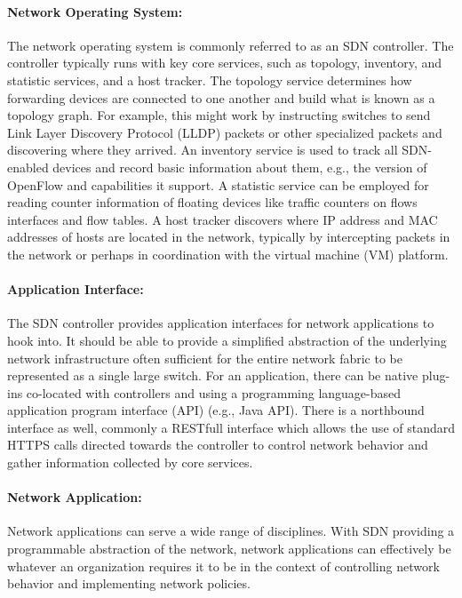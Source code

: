 \paragraph{Network Operating System:}
The network operating system is commonly referred to as an SDN controller. The controller typically runs with key core services, such as topology, inventory, and statistic services, and a host tracker. The topology service determines how forwarding devices are connected to one another and build what is known as a topology graph. For example, this might work by instructing switches to send Link Layer Discovery Protocol (LLDP) packets or other specialized packets and discovering where they arrived. An inventory service is used to track all SDN-enabled devices and record basic information about them, e.g., the version of OpenFlow and capabilities it support. A statistic service can be employed for reading counter information of floating devices like traffic counters on flows interfaces and flow tables. A host tracker discovers where IP address and MAC addresses of hosts are located in the network, typically by intercepting packets in the network or perhaps in coordination with the virtual machine (VM) platform.

\paragraph{Application Interface:}
The SDN controller provides application interfaces for network applications to hook into. It should be able to provide a simplified abstraction of the underlying network infrastructure often sufficient for the entire network fabric to be represented as a single large switch. For an application, there can be native plug-ins co-located with controllers and using a programming language-based application program interface (API) (e.g., Java API). There is a northbound interface as well, commonly a RESTfull interface which allows the use of standard HTTPS calls directed towards the controller to control network behavior and gather information collected by core services.

\paragraph{Network Application:}
Network applications can serve a wide range of disciplines. With SDN providing a programmable abstraction of the network, network applications can effectively be whatever an organization requires it to be in the context of controlling network behavior and implementing network policies.

